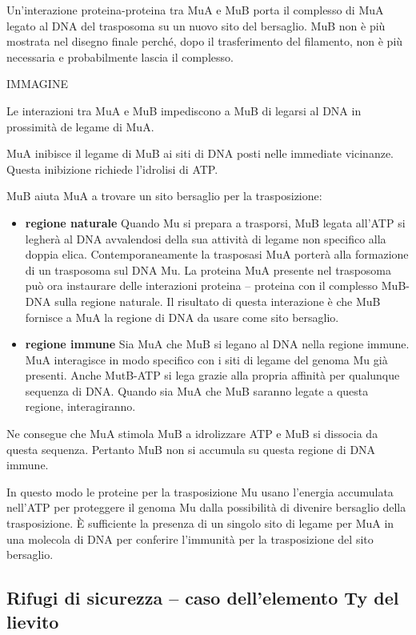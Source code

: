 \documentclass[]{article}
\begin{document}
Un'interazione proteina-proteina tra MuA e MuB porta il complesso di MuA
legato al DNA del trasposoma su un nuovo sito del bersaglio. MuB non è
più mostrata nel disegno finale perché, dopo il trasferimento del
filamento, non è più necessaria e probabilmente lascia il complesso.

IMMAGINE

Le interazioni tra MuA e MuB impediscono a MuB di legarsi al DNA in
prossimità de legame di MuA.

MuA inibisce il legame di MuB ai siti di DNA posti nelle immediate
vicinanze. Questa inibizione richiede l'idrolisi di ATP.

MuB aiuta MuA a trovare un sito bersaglio per la trasposizione:

\begin{itemize}
\itemsep1pt\parskip0pt
\item
  \textbf{regione naturale} Quando Mu si prepara a trasporsi, MuB legata
  all'ATP si legherà al DNA avvalendosi della sua attività di legame non
  specifico alla doppia elica. Contemporaneamente la trasposasi MuA
  porterà alla formazione di un trasposoma sul DNA Mu. La proteina MuA
  presente nel trasposoma può ora instaurare delle interazioni proteina
  -- proteina con il complesso MuB-DNA sulla regione naturale. Il
  risultato di questa interazione è che MuB fornisce a MuA la regione di
  DNA da usare come sito bersaglio.
\item
  \textbf{regione immune} Sia MuA che MuB si legano al DNA nella regione
  immune. MuA interagisce in modo specifico con i siti di legame del
  genoma Mu già presenti. Anche MutB-ATP si lega grazie alla propria
  affinità per qualunque sequenza di DNA. Quando sia MuA che MuB saranno
  legate a questa regione, interagiranno.
\end{itemize}

Ne consegue che MuA stimola MuB a idrolizzare ATP e MuB si dissocia da
questa sequenza. Pertanto MuB non si accumula su questa regione di DNA
immune.

In questo modo le proteine per la trasposizione Mu usano l'energia
accumulata nell'ATP per proteggere il genoma Mu dalla possibilità di
divenire bersaglio della trasposizione. È sufficiente la presenza di un
singolo sito di legame per MuA in una molecola di DNA per conferire
l'immunità per la trasposizione del sito bersaglio.

\subsection{Rifugi di sicurezza -- caso dell'elemento Ty del
lievito}\label{rifugi-di-sicurezza-caso-dellelemento-ty-del-lievito}
\end{document}
